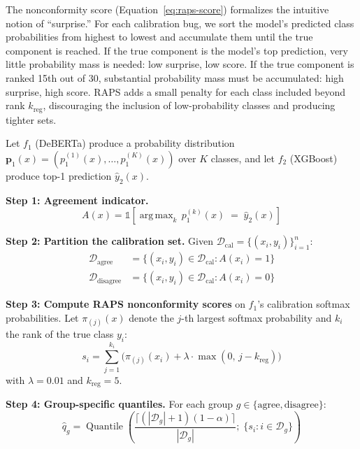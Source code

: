 \documentclass[conference]{IEEEtran}
\newcommand{\calD}{\mathcal{D}}
\newcommand{\indicator}[1]{\mathbb{1}\!\left[#1\right]}
\DeclareMathOperator*{\argmax}{arg\,max}
\DeclareMathOperator{\Quantile}{Quantile}
\begin{document}
The nonconformity score (Equation~\ref{eq:raps-score}) formalizes the intuitive notion of ``surprise.'' For each calibration bug, we sort the model's predicted class probabilities from highest to lowest and accumulate them until the true component is reached. If the true component is the model's top prediction, very little probability mass is needed: low surprise, low score. If the true component is ranked 15th out of 30, substantial probability mass must be accumulated: high surprise, high score. RAPS adds a small penalty for each class included beyond rank $k_\text{reg}$, discouraging the inclusion of low-probability classes and producing tighter sets.

Let $f_1$ (DeBERTa) produce a probability distribution $\mathbf{p}_1(x) = (p_1^{(1)}(x), \ldots, p_1^{(K)}(x))$ over $K$ classes, and let $f_2$ (XGBoost) produce top-1 prediction $\hat{y}_2(x)$.

\smallskip
\noindent\textbf{Step 1: Agreement indicator.}
\begin{equation}\label{eq:agreement}
A(x) = \indicator{\argmax_k\, p_1^{(k)}(x) \;=\; \hat{y}_2(x)}
\end{equation}

\smallskip
\noindent\textbf{Step 2: Partition the calibration set.}
Given $\calD_\text{cal} = \{(x_i, y_i)\}_{i=1}^{n}$:
\begin{align}
\calD_\text{agree} &= \{(x_i, y_i) \in \calD_\text{cal} : A(x_i) = 1\} \\
\calD_\text{disagree} &= \{(x_i, y_i) \in \calD_\text{cal} : A(x_i) = 0\}
\end{align}

\smallskip
\noindent\textbf{Step 3: Compute RAPS nonconformity scores} on $f_1$'s calibration softmax probabilities. Let $\pi_{(j)}(x)$ denote the $j$-th largest softmax probability and $k_i$ the rank of the true class $y_i$:
\begin{equation}\label{eq:raps-score}
s_i = \sum_{j=1}^{k_i} \Big(\pi_{(j)}(x_i) + \lambda \cdot \max(0,\, j - k_\text{reg})\Big)
\end{equation}
with $\lambda = 0.01$ and $k_\text{reg} = 5$.

\smallskip
\noindent\textbf{Step 4: Group-specific quantiles.}
For each group $g \in \{\text{agree}, \text{disagree}\}$:
\begin{equation}\label{eq:quantile}
\hat{q}_g = \Quantile\!\left(\frac{\lceil(|\calD_g|+1)(1-\alpha)\rceil}{|\calD_g|};\; \{s_i : i \in \calD_g\}\right)
\end{equation}
\end{document}
